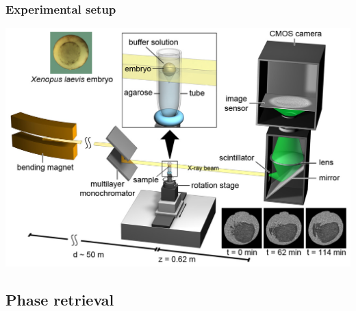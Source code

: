 \documentclass{beamer}
\begin{document}
\begin{frame}
  \frametitle{Experimental setup}
      \includegraphics[width=1\textwidth]{figures/setup/setup.jpg}
\end{frame}



\subsection{Phase retrieval}
\label{sec:phase-retrieval}
\end{document}

